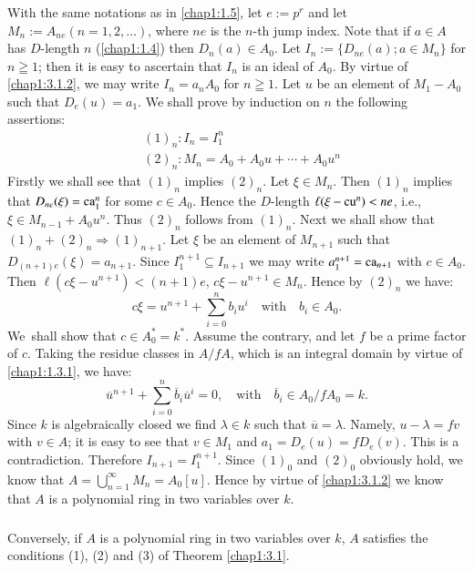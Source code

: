 \subsubsection{}\label{chap1:3.1.3}
With the same notations as in \ref{chap1:1.5}, let $e:=p^{r}$ and let
$M_{n}:=A_{ne}(n=1,2,\ldots)$, where $ne$ is the $n$-th jump
index. Note that if $a\in A$ has $D$-length $n$ (\cf \ref{chap1:1.4}) then
$D_{n}(a)\in A_{0}$. Let $I_{n}:=\{D_{ne}(a);a\in M_{n}\}$ for $n\geqq
1$; then it is easy to ascertain that $I_{n}$ is an ideal of
$A_{0}$. By virtue of \ref{chap1:3.1.2}, we may write $I_{n}=a_{n}A_{0}$ for 
$n\geqq 1$. Let $u$ be an element of $M_{1}-A_{0}$ such that
$D_{e}(u)=a_{1}$. We shall prove by induction on $n$ the following
assertions:
\begin{align*}
& (1)_{n}:I_{n}=I^{n}_{1}\\
& (2)_{n}:M_{n}=A_{0}+A_{0}u+\cdots+A_{0}u^{n}
\end{align*}
Firstly we shall see that $(1)_{n}$ implies $(2)_{n}$. Let $\xi\in
M_{n}$. Then $(1)_{n}$ implies that $D_{ne}(\xi)=\operatorname{ca}^{n}_{1}$ for some
$c\in A_{0}$. Hence the $D$-length $\ell(\xi-\operatorname{cu}^{n})<ne$, i.e.,
$\xi\in M_{n-1}+A_{0}u^{n}$. Thus $(2)_{n}$ follows from
$(1)_{n}$. Next we shall show that $(1)_{n}+(2)_{n}\Rightarrow
(1)_{n+1}$. Let $\xi$ be an element of $M_{n+1}$ such that
$D_{(n+1)e}(\xi)=a_{n+1}$. Since $I^{n+1}_{1}\subseteq I_{n+1}$ we may
write $a^{n+1}_{1}=\operatorname{ca}_{n+1}$ with $c\in A_{0}$. Then $\ell(c\xi
-u^{n+1})<(n+1)e$, \iec $c\xi-u^{n+1}\in M_{n}$. Hence by $(2)_{n}$
we have:
$$
c\xi=u^{n+1}+\sum^{n}_{i=0}b_{i}u^{i}\quad\text{with}\quad b_{i}\in
A_{0}.
$$
We\pageoriginale\ shall show that $c\in A^{\ast}_{0}=k^{\ast}$. Assume
the contrary, and let $f$ be a prime factor of $c$. Taking the residue
classes in $A/fA$, which is an integral domain by virtue of
\ref{chap1:1.3.1}, we have:
$$
\overline{u}^{n+1}+\sum^{n}_{i=0}\overline{b}_{i}\overline{u}^{i}=0,\quad\text{with}\quad
\overline{b}_{i}\in A_{0}/fA_{0}=k.
$$
Since $k$ is algebraically closed we find $\lambda\in k$ such that
$\overline{u}=\lambda$. Namely, $u-\lambda=fv$ with $v\in A$; it is
easy to see that $v\in M_{1}$ and $a_{1}=D_{e}(u)=fD_{e}(v)$. This is
a contradiction. Therefore $I_{n+1}=I^{n+1}_{1}$. Since $(1)_{0}$ and
$(2)_{0}$ obviously hold, we know that
$A=\bigcup\limits^{\infty}_{n=1}M_{n}=A_{0}[u]$. Hence by virtue of
\ref{chap1:3.1.2} we know that $A$ is a polynomial ring in two variables over
$k$.

\subsubsection{}\label{chap1:3.1.4}
Conversely, if $A$ is a polynomial ring in two variables over $k$, $A$
satisfies the conditions (1), (2) and (3) of Theorem \ref{chap1:3.1}.


